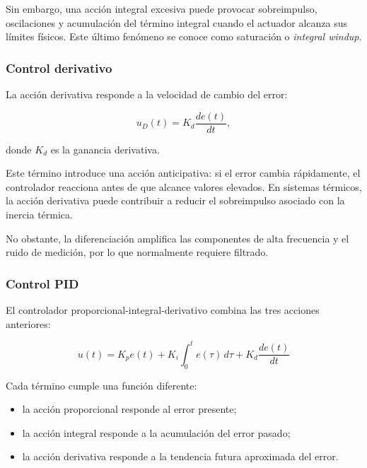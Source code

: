 Sin embargo, una acción integral excesiva puede provocar sobreimpulso, oscilaciones y acumulación del término integral cuando el actuador alcanza sus límites físicos. Este último fenómeno se conoce como saturación o \textit{integral windup}.

\subsubsection{Control derivativo}

La acción derivativa responde a la velocidad de cambio del error:

\begin{equation}
u_D(t)
=
K_d
\frac{de(t)}{dt},
\label{eq:control_d}
\end{equation}

donde $K_d$ es la ganancia derivativa.

Este término introduce una acción anticipativa: si el error cambia rápidamente, el controlador reacciona antes de que alcance valores elevados. En sistemas térmicos, la acción derivativa puede contribuir a reducir el sobreimpulso asociado con la inercia térmica.

No obstante, la diferenciación amplifica las componentes de alta frecuencia y el ruido de medición, por lo que normalmente requiere filtrado.

\subsubsection{Control PID}

El controlador proporcional-integral-derivativo combina las tres acciones anteriores:

\begin{equation}
\boxed{
u(t)
=
K_p e(t)
+
K_i
\int_{0}^{t}
e(\tau)\,d\tau
+
K_d
\frac{de(t)}{dt}
}
\label{eq:control_pid}
\end{equation}

Cada término cumple una función diferente:

\begin{itemize}
    \item la acción proporcional responde al error presente;
    \item la acción integral responde a la acumulación del error pasado;
    \item la acción derivativa responde a la tendencia futura aproximada del error.
\end{itemize}

